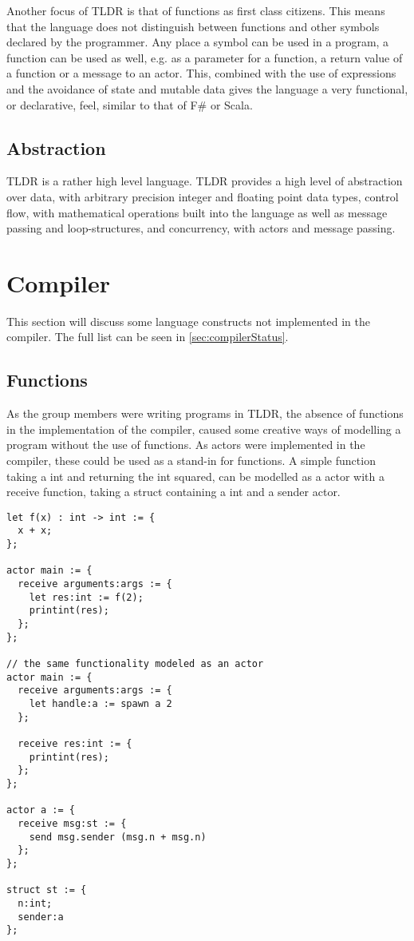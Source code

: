 Another focus of TLDR is that of functions as first class citizens. This means that the language does not distinguish between functions and other symbols declared by the programmer. Any place a symbol can be used in a program, a function can be used as well, e.g. as a parameter for a function, a return value of a function or a message to an actor. This, combined with the use of expressions and the avoidance of state and mutable data gives the language a very functional, or declarative, feel, similar to that of F\# or Scala.

\subsection{Abstraction}
TLDR is a rather high level language. TLDR provides a high level of abstraction over data, with arbitrary precision integer and floating point data types, control flow, with mathematical operations built into the language as well as message passing and loop-structures, and concurrency, with actors and message passing.

\section{Compiler}

This section will discuss some language constructs not implemented in the compiler. The full list can be seen in \cref{sec:compilerStatus}.

\subsection{Functions}

As the group members were writing programs in TLDR, the absence of functions in the implementation of the compiler, caused some creative ways of modelling a program without the use of functions. As actors were implemented in the compiler, these could be used as a stand-in for functions. A simple function taking a int and returning the int squared, can be modelled as a actor with a receive function, taking a struct containing a int and a sender actor. 

\begin{lstlisting}[caption = {Example of modeling a function taking a int and returning the int squared, as an actor.}]
let f(x) : int -> int := {
  x + x;
};

actor main := {
  receive arguments:args := {
    let res:int := f(2);
    printint(res);
  };
};

// the same functionality modeled as an actor
actor main := {
  receive arguments:args := {
    let handle:a := spawn a 2
  };
  
  receive res:int := {
    printint(res);
  };
};

actor a := {
  receive msg:st := {
    send msg.sender (msg.n + msg.n)
  };
};

struct st := {
  n:int;
  sender:a
};
\end{lstlisting}

